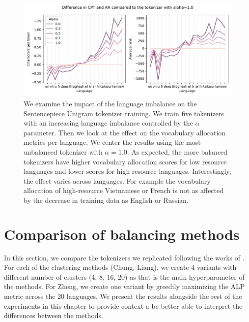 \begin{figure}[H]
    \centering
    \includegraphics[width=\textwidth]{figures/ar_cpt_vs_alpha.pdf}
    \caption{We examine the impact of the language imbalance on the Sentencepiece Unigram tokenizer training. We train five tokenizers with an increasing language imbalance controlled by the $\alpha$ parameter. Then we look at the effect on the vocabulary allocation metrics per language. We center the results using the most unbalanced tokenizer with $\alpha=1.0$. As expected, the more balanced tokenizers have higher vocabulary allocation scores for low resource languages and lower scores for high resource languages. Interestingly, the effect varies across languages. For example the vocabulary allocation of high-resource Vietnamese or French is not as affected by the decrease in training data as English or Russian. }
    \label{fig:data_balance_vs_allocation_per_lang}
\end{figure}


\section{Comparison of balancing methods}



In this section, we compare the tokenizers we replicated following the works of \citet{chung_improving_2020,zheng_allocating_2021,liang_xlm-v_2023}. For each of the clustering methods (Chung, Liang), we create 4 variants with different number of clusters (4, 8, 16, 20) as that is the main hyperparameter of the methods. For Zheng, we create one variant by greedily maximizing the ALP metric across the 20 languages. We present the results alongside the rest of the experiments in this chapter to provide context a be better able to interpret the differences between the methods.

